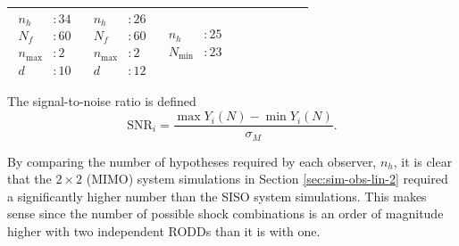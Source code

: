 \begin{table}[ht]
\begin{center}
\begin{tabular}{
				l
				|
				c
				c
				c
				c
				c
				|
				>{\centering\arraybackslash}p{0.9in}
				>{\centering\arraybackslash}p{0.8in}
				>{\centering\arraybackslash}p{0.8in}
			}
			$\begin{aligned} n_h & :34 \\ N_f & :60 \\ n_\text{max} & :2 \\ d & :10 \end{aligned}$ & 
			$\begin{aligned} n_h & :26 \\ N_f & :60 \\ n_\text{max} & :2 \\ d & :12 \end{aligned}$ & 
			$\begin{aligned} n_h & :25 \\ N_\text{min} & :23 \end{aligned}$ \\
			\hline
		\end{tabular}
	\end{center}
\end{table}

The signal-to-noise ratio is defined
\begin{equation} \label{eq:SNR}
	\text{SNR}_i=\frac{\max{Y_i(N)}-\min{Y_i(N)}}{\sigma_M}.
\end{equation}

By comparing the number of hypotheses required by each observer, $n_h$, it is clear that the $2 \times 2$ (\gls{MIMO}) system simulations in Section \ref{sec:sim-obs-lin-2} required a significantly higher number than the \gls{SISO} system simulations. This makes sense since the number of possible shock combinations is an order of magnitude higher with two independent \gls{RODD}s than it is with one.

